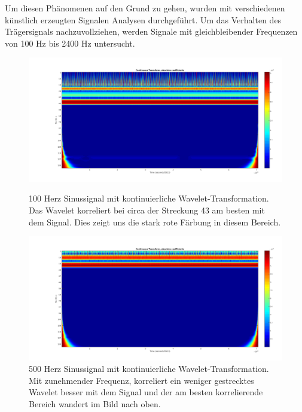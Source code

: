 \begin{refsection}
Um diesen Phänomenen auf den Grund zu gehen, wurden mit verschiedenen künstlich erzeugten Signalen Analysen durchgeführt.
Um das Verhalten des Trägersignals nachzuvollziehen, werden Signale mit gleichbleibender Frequenzen von 100 Hz bis 2400 Hz untersucht.
\begin{figure}[h]
	\centering
	\includegraphics[width=0.9\linewidth]{papers/meteor/images/anomalie/beam/cwt_0100hz.png}
	\caption{100 Herz Sinussignal mit kontinuierliche Wavelet-Transformation.
	Das Wavelet korreliert bei circa der Streckung 43 am besten mit dem Signal. 
	Dies zeigt uns die stark rote Färbung in diesem Bereich.}
	\includegraphics[width=0.9\linewidth]{papers/meteor/images/anomalie/beam/cwt_0500hz.png}
	\caption{500 Herz Sinussignal mit kontinuierliche Wavelet-Transformation.
	Mit zunehmender Frequenz, korreliert ein weniger gestrecktes Wavelet besser mit dem Signal und der am besten korrelierende Bereich wandert im Bild nach oben. }
	\label{fig:cwt_anomalie_beam_1}
\end{figure}


\end{refsection}
